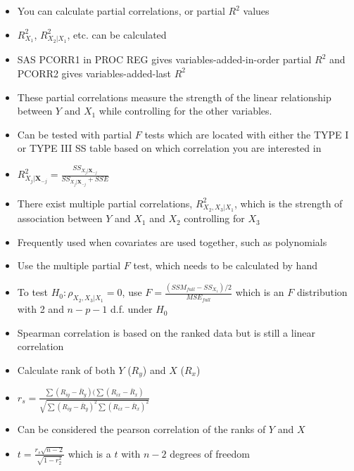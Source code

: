 \documentclass[handout,x11names,unknownkeysallowed]{beamer}
\makeatletter
\newcommand{\beamitem}{\begin{itemize}[<+-|alert@+>]}
\makeatother
\begin{document}
\begin{frame}

\beamitem
\item You can calculate partial correlations, or partial $R^2$ values
\item $R^2_{X_1}$, $R^2_{X_2|X_1}$, etc. can be calculated
\item SAS PCORR1 in PROC REG gives variables-added-in-order partial $R^2$ and PCORR2 gives variables-added-last $R^2$
\item These partial correlations measure the strength of the linear relationship between $Y$ and $X_1$ while controlling for the other variables.
\item Can be tested with partial $F$ tests which are located with either the TYPE I or TYPE III SS table based on which correlation you are interested in
\item $R^2_{X_j|\bm{X}_{-j}} = \frac{SS_{X_j | \bm{X}_{-j}}}{SS_{X_j | \bm{X}_{-j}} + SSE}$
\end{itemize}
\end{frame}


\begin{frame}
\beamitem
\item There exist multiple partial correlations, $R^2_{X_2,X_3|X_1}$, which is the strength of association between $Y$ and $X_1$ and $X_2$ controlling for $X_3$
\item Frequently used when covariates are used together, such as polynomials
\item Use the multiple partial $F$ test, which needs to be calculated by hand
\item To test $H_0: \rho_{X_2,X_3|X_1} = 0$, use $F= \frac{(SSM_{full} - SS_{X_1})/2}{MSE_{full}}$ which is an $F$ distribution with 2 and $n-p-1$ d.f. under $H_0$
\end{itemize}
\end{frame}


\begin{frame}
\beamitem
\item Spearman correlation is based on the ranked data but is still a linear correlation
\item Calculate rank of both $Y$ ($R_{y}$) and $X$ ($R_{x}$)
\item $r_s = \frac{\sum(R_{iy}-\bar{R}_{y})(\sum(R_{ix}-\bar{R}_{x})}{\sqrt{\sum(R_{iy}-\bar{R}_{y})^2 \sum(R_{ix}-\bar{R}_{x})^2}}$
\item Can be considered the pearson correlation of the ranks of $Y$ and $X$
\item $t=\frac{r_s\sqrt{n-2}}{\sqrt{1-r_2^2}}$ which is a $t$ with $n-2$ degrees of freedom
\end{itemize}
\end{frame}
\end{document}

